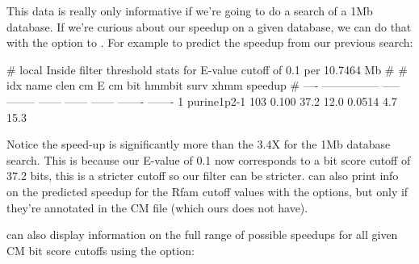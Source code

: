 This data is really only informative if we're going to do a search of
a 1Mb database. If we're curious about our speedup on a given
database, we can do that with the  option to
. For example to predict the speedup from our previous
search: 


\begin{sreoutput}
# local Inside filter threshold stats for E-value cutoff of  0.1 per 10.7464 Mb
#
#  idx  name              clen      cm E  cm bit  hmmbit    surv     xhmm  speedup
# ----  ---------------  -----  --------  ------  ------  ------  -------  -------
     1  purine1p2-1        103     0.100    37.2    12.0  0.0514      4.7     15.3
\end{sreoutput}

Notice the speed-up is significantly more than the 3.4X for the 1Mb
database search. This is because our E-value of 0.1 now corresponds to
a bit score cutoff of 37.2 bits, this is a stricter cutoff so our
filter can be stricter. can also print info on the
predicted speedup for the Rfam cutoff values with the  options, but only if they're annotated in the CM file
(which ours does not have). 

 can also display information on the full range of
possible speedups for all given CM bit score cutoffs using the
 option: 


